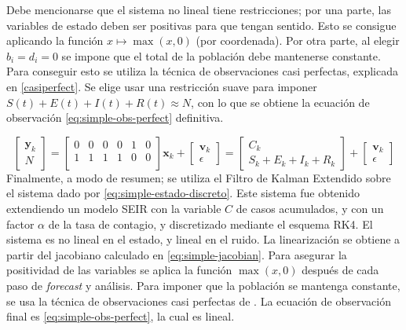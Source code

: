 Debe mencionarse que el sistema no lineal tiene restricciones; por una parte, las variables de estado deben ser positivas para que tengan sentido. Esto se consigue aplicando la función \(x \mapsto \max(x, 0)\) (por coordenada). Por otra parte, al elegir \(b_i = d_i = 0\) se impone que el total de la población debe mantenerse constante. Para conseguir esto se utiliza la técnica de observaciones casi perfectas, explicada en \ref{casiperfect}. Se elige usar una restricción suave para imponer \(S(t) + E(t) + I(t) + R(t) \approx N\), con lo que se obtiene la ecuación de observación \ref{eq:simple-obs-perfect} definitiva.

\begin{equation} \label{eq:simple-obs-perfect}
\begin{bmatrix}
\mathbf{y}_{k} \\
N
\end{bmatrix} = 
\begin{bmatrix}
0 & 0 & 0 & 0 & 1 & 0 \\
1 & 1 & 1 & 1 & 0 & 0 \\
\end{bmatrix}
\mathbf{x}_{k} + 
\begin{bmatrix}
\mathbf{v}_k \\
\epsilon
\end{bmatrix} =
\begin{bmatrix}
C_k \\
S_k + E_k + I_k + R_k
\end{bmatrix}
 + 
\begin{bmatrix}
\mathbf{v}_k \\
\epsilon
\end{bmatrix}
\end{equation}
Finalmente, a modo de resumen; se utiliza el Filtro de Kalman Extendido sobre el sistema dado por \ref{eq:simple-estado-discreto}. Este sistema fue obtenido extendiendo un modelo SEIR con la variable \(C\) de casos acumulados, y con un factor \(\alpha\) de la tasa de contagio, y discretizado mediante el esquema RK4. El sistema es no lineal en el estado, y lineal en el ruido. La linearización se obtiene a partir del jacobiano calculado en \ref{eq:simple-jacobian}. Para asegurar la positividad de las variables se aplica la función \(\max(x, 0)\) después de cada paso de \textit{forecast} y análisis. Para imponer que la población se mantenga constante, se usa la técnica de observaciones casi perfectas de \cite{Simon2010}. La ecuación de observación final es \ref{eq:simple-obs-perfect}, la cual es lineal.

